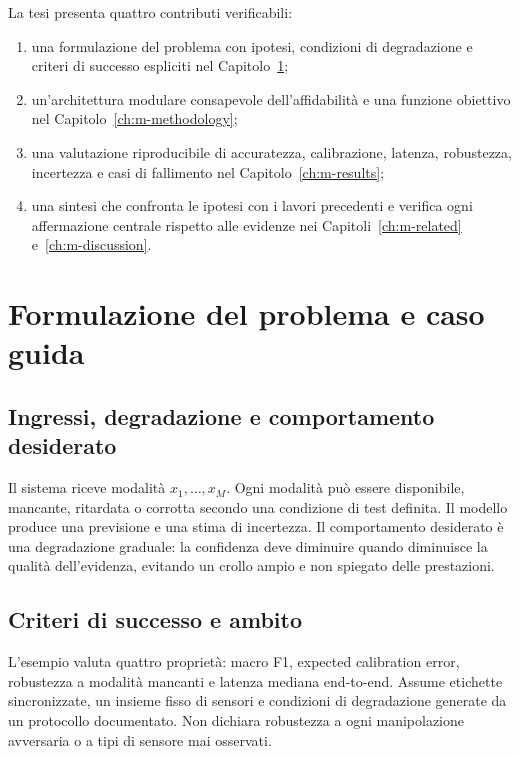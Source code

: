 La tesi presenta quattro contributi verificabili:
\begin{enumerate}
  \item una formulazione del problema con ipotesi, condizioni di degradazione e criteri di successo espliciti nel Capitolo~\ref{ch:m-problem};
  \item un'architettura modulare consapevole dell'affidabilità e una funzione obiettivo nel Capitolo~\ref{ch:m-methodology};
  \item una valutazione riproducibile di accuratezza, calibrazione, latenza, robustezza, incertezza e casi di fallimento nel Capitolo~\ref{ch:m-results};
  \item una sintesi che confronta le ipotesi con i lavori precedenti e verifica ogni affermazione centrale rispetto alle evidenze nei Capitoli~\ref{ch:m-related} e~\ref{ch:m-discussion}.
\end{enumerate}

\chapter{Formulazione del problema e caso guida}\label{ch:m-problem}
\section{Ingressi, degradazione e comportamento desiderato}
Il sistema riceve modalità $x_1,\ldots,x_M$. Ogni modalità può essere disponibile, mancante, ritardata o corrotta secondo una condizione di test definita. Il modello produce una previsione e una stima di incertezza. Il comportamento desiderato è una degradazione graduale: la confidenza deve diminuire quando diminuisce la qualità dell'evidenza, evitando un crollo ampio e non spiegato delle prestazioni.

\section{Criteri di successo e ambito}
L'esempio valuta quattro proprietà: macro F1, expected calibration error, robustezza a modalità mancanti e latenza mediana end-to-end. Assume etichette sincronizzate, un insieme fisso di sensori e condizioni di degradazione generate da un protocollo documentato. Non dichiara robustezza a ogni manipolazione avversaria o a tipi di sensore mai osservati.

